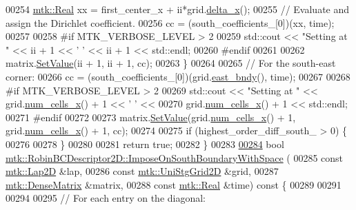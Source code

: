 \begin{DoxyCode}
00254     \hyperlink{group__c01-roots_gac080bbbf5cbb5502c9f00405f894857d}{mtk::Real} xx = first\_center\_x + ii*grid.\hyperlink{classmtk_1_1UniStgGrid2D_aca4710004c4a7da6a9e8fd6ab32a691f}{delta\_x}();
00255     \textcolor{comment}{// Evaluate and assign the Dirichlet coefficient.}
00256     cc = (south\_coefficients\_[0])(xx, time);
00257 
00258 \textcolor{preprocessor}{    #if MTK\_VERBOSE\_LEVEL > 2}
00259     std::cout << \textcolor{stringliteral}{"Setting at "} << ii + 1 << \textcolor{charliteral}{' '} << ii + 1 << std::endl;
00260 \textcolor{preprocessor}{    #endif}
00261 
00262     matrix.\hyperlink{classmtk_1_1DenseMatrix_a784ce5784109ac86bfb9d8562b334b13}{SetValue}(ii + 1, ii + 1, cc);
00263   \}
00264 
00265   \textcolor{comment}{// For the south-east corner:}
00266   cc = (south\_coefficients\_[0])(grid.\hyperlink{classmtk_1_1UniStgGrid2D_a03f689eb29a6369b82ce1207c655d5ff}{east\_bndy}(), time);
00267 
00268 \textcolor{preprocessor}{  #if MTK\_VERBOSE\_LEVEL > 2}
00269   std::cout << \textcolor{stringliteral}{"Setting at "} << grid.\hyperlink{classmtk_1_1UniStgGrid2D_a2d182866a398aba8e4829590e85bf939}{num\_cells\_x}() + 1 << \textcolor{charliteral}{' '} <<
00270     grid.\hyperlink{classmtk_1_1UniStgGrid2D_a2d182866a398aba8e4829590e85bf939}{num\_cells\_x}() + 1 << std::endl;
00271 \textcolor{preprocessor}{  #endif}
00272 
00273   matrix.\hyperlink{classmtk_1_1DenseMatrix_a784ce5784109ac86bfb9d8562b334b13}{SetValue}(grid.\hyperlink{classmtk_1_1UniStgGrid2D_a2d182866a398aba8e4829590e85bf939}{num\_cells\_x}() + 1, grid.\hyperlink{classmtk_1_1UniStgGrid2D_a2d182866a398aba8e4829590e85bf939}{num\_cells\_x}() + 1, cc);
00274 
00275   \textcolor{keywordflow}{if} (highest\_order\_diff\_south\_ > 0) \{
00276 
00278   \}
00280 
00281   \textcolor{keywordflow}{return} \textcolor{keyword}{true};
00282 \}
00283 
\hypertarget{mtk__robin__bc__descriptor__2d_8cc_source_l00284}{}\hyperlink{classmtk_1_1RobinBCDescriptor2D_a2f99cdd8bda2bc46cf259bb96ef4bd49}{00284} \textcolor{keywordtype}{bool} \hyperlink{classmtk_1_1RobinBCDescriptor2D_a2f99cdd8bda2bc46cf259bb96ef4bd49}{mtk::RobinBCDescriptor2D::ImposeOnSouthBoundaryWithSpace}
      (
00285     \textcolor{keyword}{const} \hyperlink{classmtk_1_1Lap2D}{mtk::Lap2D} &lap,
00286     \textcolor{keyword}{const} \hyperlink{classmtk_1_1UniStgGrid2D}{mtk::UniStgGrid2D} &grid,
00287     \hyperlink{classmtk_1_1DenseMatrix}{mtk::DenseMatrix} &matrix,
00288     \textcolor{keyword}{const} \hyperlink{group__c01-roots_gac080bbbf5cbb5502c9f00405f894857d}{mtk::Real} &time)\textcolor{keyword}{ const }\{
00289 
00291 
00294 
00295   \textcolor{comment}{// For each entry on the diagonal:}

\end{DoxyCode}
